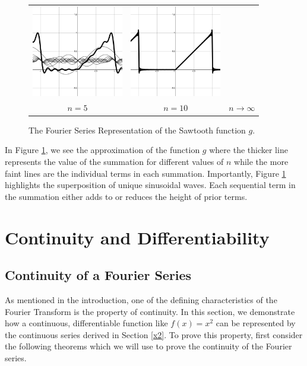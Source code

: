 \documentclass[11pt]{amsart}
\theoremstyle{plain}
\theoremstyle{definition}
\begin{document}
\begin{figure}[ht!]
\begin{tabular}{ccc}
  \includegraphics[width=40mm]{Images/complex_10.png} &
  \includegraphics[width=40mm]{Images/complex_full.png} \\
  $n=5$ & $n=10$ & $n\to\infty$\\[6pt]
\end{tabular}
\caption{\centering The Fourier Series Representation of the Sawtooth function $g$.}
\label{fig:complex}
\end{figure}

In Figure \ref{fig:complex}, we see the approximation of the function $g$ where the thicker line represents the value of the summation for different values of $n$ while the more faint lines are the individual terms in each summation. Importantly, Figure \ref{fig:complex} highlights the superposition of unique sinusoidal waves. Each sequential term in the summation either adds to or reduces the height of prior terms.

\section{Continuity and Differentiability}

\subsection{Continuity of a Fourier Series}
As mentioned in the introduction, one of the defining characteristics of the Fourier Transform is the property of continuity. In this section, we demonstrate how a continuous, differentiable function like $f(x)=x^2$ can be represented by the continuous series derived in Section \ref{x2}. To prove this property, first consider the following theorems which we will use to prove the continuity of the Fourier series. 
\end{document}
